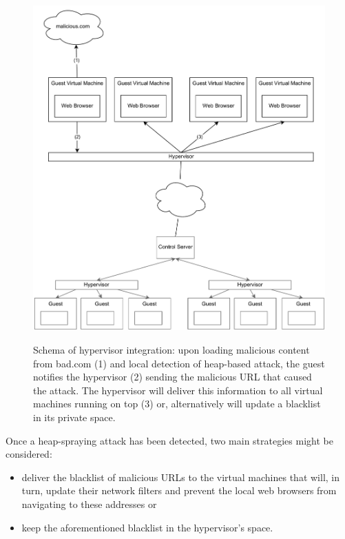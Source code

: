 \begin{figure}[t!]
\begin{center}
\includegraphics[scale=0.55]{images/virtualDesktop.pdf}
\caption{{Schema of hypervisor integration: upon loading malicious content from bad.com (1) and local detection of  heap-based attack, the guest notifies the hypervisor (2) sending the malicious URL that caused the attack. The hypervisor will deliver this information to all virtual machines running on top (3) or, alternatively will update a blacklist in its private space.}}
\vspace{0.3cm}
\label{virtualdesktop}
\end{center}
\end{figure}


Once a heap-spraying attack has been detected, two main strategies might be considered:  

\begin{itemize}
\item deliver the blacklist of malicious URLs to the virtual machines that will, in turn, update their network filters and prevent the local web browsers from navigating to these addresses or 

\item keep the aforementioned blacklist in the hypervisor's space. 
\end{itemize}


